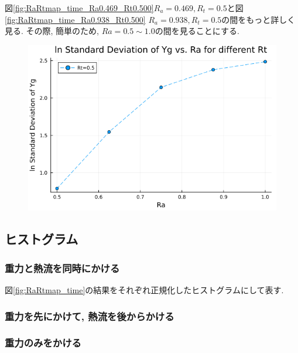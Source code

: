 図\ref{fig:RaRtmap_time_Ra0.469_Rt0.500}$R_a = 0.469, R_t = 0.5$と図\ref{fig:RaRtmap_time_Ra0.938_Rt0.500} $R_a = 0.938, R_t = 0.5$の間をもっと詳しく見る. その際, 簡単のため, $Ra =0.5 \sim 1.0$の間を見ることにする.



\begin{figure}[H]
  \centering
  \includegraphics[scale=0.5]{image/lnStdYg_Ra0.5to1.0_Rt0.5_ti25000.png}
  \caption{}
  \label{}
\end{figure}


\subsection{ヒストグラム}

\subsubsection{重力と熱流を同時にかける}

図\ref{fig:RaRtmap_time}の結果をそれぞれ正規化したヒストグラムにして表す.



\subsubsection{重力を先にかけて, 熱流を後からかける}



\subsubsection{重力のみをかける}

